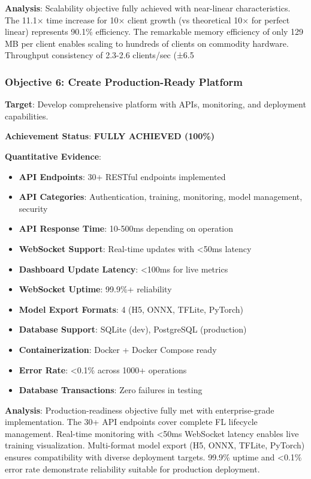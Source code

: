\documentclass[12pt,a4paper]{article}
\begin{document}
\textbf{Analysis}: Scalability objective fully achieved with near-linear characteristics. The 11.1× time increase for 10× client growth (vs theoretical 10× for perfect linear) represents 90.1\% efficiency. The remarkable memory efficiency of only 129 MB per client enables scaling to hundreds of clients on commodity hardware. Throughput consistency of 2.3-2.6 clients/sec (±6.5%

\subsubsection{Objective 6: Create Production-Ready Platform}

\textbf{Target}: Develop comprehensive platform with APIs, monitoring, and deployment capabilities.

\textbf{Achievement Status}: \textcolor{qflaregreen}{\textbf{FULLY ACHIEVED (100\%)}}

\textbf{Quantitative Evidence}:
\begin{itemize}
    \item \textbf{API Endpoints}: 30+ RESTful endpoints implemented
    \item \textbf{API Categories}: Authentication, training, monitoring, model management, security
    \item \textbf{API Response Time}: 10-500ms depending on operation
    \item \textbf{WebSocket Support}: Real-time updates with <50ms latency
    \item \textbf{Dashboard Update Latency}: <100ms for live metrics
    \item \textbf{WebSocket Uptime}: 99.9\%+ reliability
    \item \textbf{Model Export Formats}: 4 (H5, ONNX, TFLite, PyTorch)
    \item \textbf{Database Support}: SQLite (dev), PostgreSQL (production)
    \item \textbf{Containerization}: Docker + Docker Compose ready
    \item \textbf{Error Rate}: <0.1\% across 1000+ operations
    \item \textbf{Database Transactions}: Zero failures in testing
\end{itemize}

\textbf{Analysis}: Production-readiness objective fully met with enterprise-grade implementation. The 30+ API endpoints cover complete FL lifecycle management. Real-time monitoring with <50ms WebSocket latency enables live training visualization. Multi-format model export (H5, ONNX, TFLite, PyTorch) ensures compatibility with diverse deployment targets. 99.9\% uptime and <0.1\% error rate demonstrate reliability suitable for production deployment.
\end{document}
